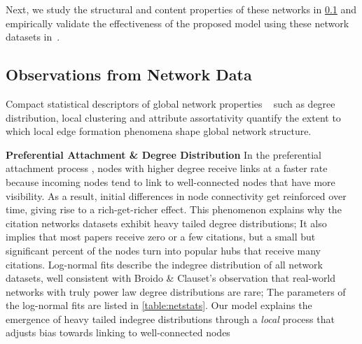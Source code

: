 Next, we study the structural and content properties of these networks in \cref{subsec:factors} and empirically
validate the effectiveness of the proposed model using these network datasets in~.
%


\subsection{Observations from Network Data}
\label{subsec:factors}

Compact
statistical descriptors of global network properties ~\cite{newman2010networks}
such as degree distribution, local clustering and attribute assortativity
quantify the extent to which local edge formation phenomena shape global network
structure.

\textbf{Preferential Attachment \& Degree Distribution}
In the preferential attachment process  \cite{simon1955class,barabasi1999emergence},
nodes with higher degree receive links at a faster rate because incoming nodes tend to
link to well-connected nodes that have more visibility. As a result, initial differences in node
connectivity get reinforced over time, giving rise to a rich-get-richer effect.
This phenomenon  explains why the citation networks datasets exhibit heavy
tailed degree distributions; It also implies that most papers receive zero or a few
citations, but a small but significant percent of the nodes turn into popular
hubs that receive many citations. Log-normal fits describe the indegree
distribution of all network datasets, well consistent with Broido \& Clauset's
\cite{broido2018scale} observation that real-world networks with truly power law
degree distributions are rare; The parameters of the log-normal fits are
listed in \cref{table:netstats}. Our model explains the emergence of heavy
tailed indegree distributions through a \textit{local} process that
adjusts bias towards linking to well-connected nodes

